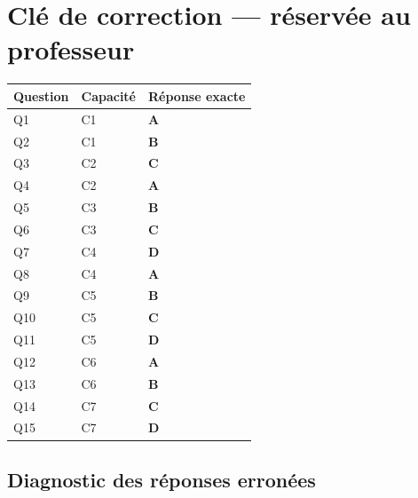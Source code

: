 \ifnxVersionProfesseur
\clearpage
\section*{Clé de correction — réservée au professeur}

\begin{center}
\begin{tabular}{lll}
\hline
Question & Capacité & Réponse exacte \\
\hline
Q1 & C1 & \textbf{A} \\
Q2 & C1 & \textbf{B} \\
Q3 & C2 & \textbf{C} \\
Q4 & C2 & \textbf{A} \\
Q5 & C3 & \textbf{B} \\
Q6 & C3 & \textbf{C} \\
Q7 & C4 & \textbf{D} \\
Q8 & C4 & \textbf{A} \\
Q9 & C5 & \textbf{B} \\
Q10 & C5 & \textbf{C} \\
Q11 & C5 & \textbf{D} \\
Q12 & C6 & \textbf{A} \\
Q13 & C6 & \textbf{B} \\
Q14 & C7 & \textbf{C} \\
Q15 & C7 & \textbf{D} \\
\hline
\end{tabular}
\end{center}

\subsection*{Diagnostic des réponses erronées}

